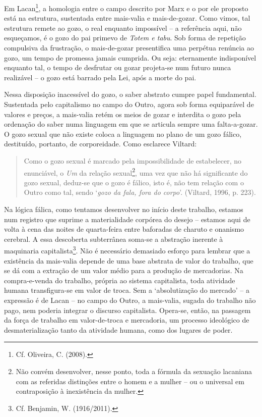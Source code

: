 Em Lacan\footnote{Cf. Oliveira, C. (2008).}, a homologia entre o campo
descrito por Marx e o por ele proposto está na estrutura, sustentada
entre mais-valia e mais-de-gozar. Como vimos, tal estrutura remete ao
gozo, o real enquanto impossível -- a referência aqui, não esqueçamos, é
o gozo do pai primevo de \emph{Totem e tabu}. Sob forma de repetição
compulsiva da frustração, o mais-de-gozar presentifica uma perpétua
renúncia ao gozo, um tempo de promessa jamais cumprida. Ou seja:
eternamente indisponível enquanto tal, o tempo de desfrutar ou gozar
projeta-se num futuro nunca realizável -- o gozo está barrado pela Lei,
após a morte do pai.

Nessa disposição inacessível do gozo, o saber abstrato cumpre papel
fundamental. Sustentada pelo capitalismo no campo do Outro, agora sob
forma equiparável de valores e preços, a mais-valia retém os meios de
gozar e interdita o gozo pela ordenação do saber numa linguagem em que
se articula sempre uma falta-a-gozar. O gozo sexual que não existe
coloca a linguagem no plano de um gozo fálico, destituído, portanto, de
corporeidade. Como esclarece Viltard:

\begin{quote}
Como o gozo sexual é marcado pela impossibilidade de estabelecer, no
enunciável, o \emph{Um} da relação sexual\footnote{Não convém
  desenvolver, nesse ponto, toda a fórmula da sexuação lacaniana com as
  referidas distinções entre o homem e a mulher -- ou o universal em
  contraposição à inexistência da mulher.}, uma vez que não há
significante do gozo sexual, deduz-se que o gozo é fálico, isto é, não
tem relação com o Outro como tal, sendo `\emph{gozo da fala, fora do
corpo}'. (Viltard, 1996, p. 223).
\end{quote}

Na lógica fálica, como tentamos desenvolver no início deste trabalho,
estamos num registro que suprime a materialidade corpórea do desejo --
estamos aqui de volta à cena das noites de quarta-feira entre baforadas
de charuto e onanismo cerebral. A essa descoberta subterrânea soma-se a
abstração inerente à maquinaria capitalista\footnote{Cf. Benjamin, W.
  (1916/2011).}. Não é necessário demasiado esforço para lembrar que a
existência da mais-valia depende de uma base abstrata de valor do
trabalho, que se dá com a extração de um valor médio para a produção de
mercadorias. Na compra-e-venda do trabalho, própria ao sistema
capitalista, toda atividade humana transfigura-se em valor de troca. Sem
a `absolutização do mercado' -- a expressão é de Lacan -- no campo do
Outro, a mais-valia, sugada do trabalho não pago, nem poderia integrar o
discurso capitalista. Opera-se, então, na passagem da força de trabalho
em valor-de-troca e mercadoria, um processo ideológico de
desmaterialização tanto da atividade humana, como dos lugares de poder.

